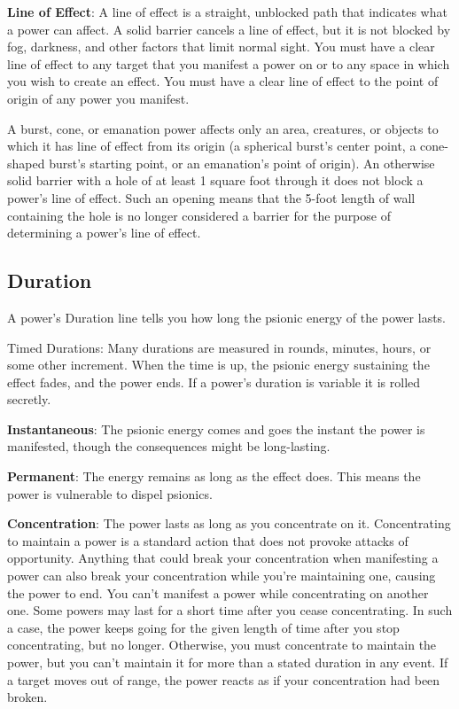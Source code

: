 \textbf{Line of Effect}: A line of effect is a straight, unblocked path that indicates what a power can affect. A solid barrier cancels a line of effect, but it is not blocked by fog, darkness, and other factors that limit normal sight. You must have a clear line of effect to any target that you manifest a power on or to any space in which you wish to create an effect. You must have a clear line of effect to the point of origin of any power you manifest.

A burst, cone, or emanation power affects only an area, creatures, or objects to which it has line of effect from its origin (a spherical burst's center point, a cone-shaped burst's starting point, or an emanation's point of origin). An otherwise solid barrier with a hole of at least 1 square foot through it does not block a power's line of effect. Such an opening means that the 5-foot length of wall containing the hole is no longer considered a barrier for the purpose of determining a power's line of effect.

\subsection{Duration}
A power's Duration line tells you how long the psionic energy of the power lasts.

Timed Durations: Many durations are measured in rounds, minutes, hours, or some other increment. When the time is up, the psionic energy sustaining the effect fades, and the power ends. If a power's duration is variable it is rolled secretly.

\textbf{Instantaneous}: The psionic energy comes and goes the instant the power is manifested, though the consequences might be long-lasting.

\textbf{Permanent}: The energy remains as long as the effect does. This means the power is vulnerable to dispel psionics.

\textbf{Concentration}: The power lasts as long as you concentrate on it. Concentrating to maintain a power is a standard action that does not provoke attacks of opportunity. Anything that could break your concentration when manifesting a power can also break your concentration while you're maintaining one, causing the power to end. You can't manifest a power while concentrating on another one. Some powers may last for a short time after you cease concentrating. In such a case, the power keeps going for the given length of time after you stop concentrating, but no longer. Otherwise, you must concentrate to maintain the power, but you can't maintain it for more than a stated duration in any event. If a target moves out of range, the power reacts as if your concentration had been broken.

